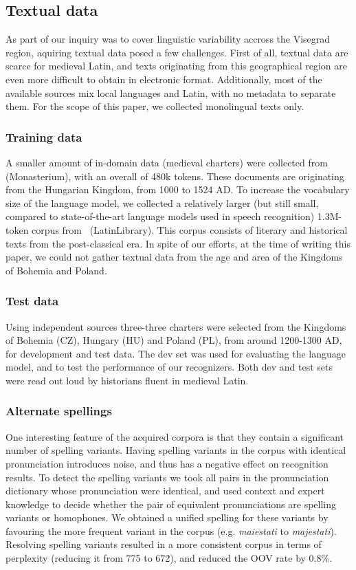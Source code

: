 \documentclass[runningheads,a4paper]{llncs}
\begin{document}
\subsection{Textual data}\label{text}
As part of our inquiry was to cover linguistic variability accross the Visegrad region, aquiring textual data posed a few challenges.
First of all, textual data are scarce for medieval Latin, and texts originating from this geographical region are even more difficult to obtain in electronic format.
Additionally, most of the available sources mix local languages and Latin, with no metadata to separate them.
For the scope of this paper, we collected monolingual texts only.
\subsubsection{Training data}\label{traintext}
A smaller amount of in-domain data (medieval charters) were collected from~\cite{monasterium} (Monasterium), with an overall of 480k tokens.
These documents are originating from the Hungarian Kingdom, from 1000 to 1524 AD.
To increase the vocabulary size of the language model, we collected a relatively larger (but still small, compared to state-of-the-art language models used in speech recognition) 1.3M-token corpus from~\cite{latinlibrary} (LatinLibrary).
This corpus consists of literary and historical texts from the post-classical era.
In spite of our efforts, at the time of writing this paper, we could not gather textual data from the age and area of the Kingdoms of Bohemia and Poland.
\subsubsection{Test data}\label{testtext}
Using independent sources three-three charters were selected from the Kingdoms of Bohemia (CZ), Hungary (HU) and Poland (PL), from around 1200-1300 AD, for development and test data.
The dev set was used for evaluating the language model, and to test the performance of our recognizers.
Both dev and test sets were read out loud by historians fluent in medieval Latin.
\subsubsection{Alternate spellings}
One interesting feature of the acquired corpora is that they contain a significant number of spelling variants.
Having spelling variants in the corpus with identical pronunciation introduces noise, and thus has a negative effect on recognition results.
To detect the spelling variants we took all pairs in the pronunciation dictionary whose pronunciation were identical, and used context and expert knowledge to decide whether the pair of equivalent pronunciations are spelling variants or homophones.
We obtained a unified spelling for these variants by favouring the more frequent variant in the corpus (e.g. \textit{maiestati} to \textit{majestati}).
Resolving spelling variants resulted in a more consistent corpus in terms of perplexity (reducing it from 775 to 672), and reduced the OOV rate by 0.8\%.
\end{document}

